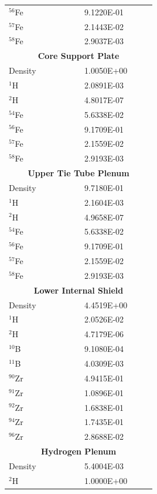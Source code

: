 \documentclass[8pt,a4paper]{article}
\begin{document}
\begin{longtable}{|m{0.3\linewidth}|m{0.2\linewidth}|}
    $^{56}$Fe & \SI{9.1220E-01}{} \\
    $^{57}$Fe & \SI{2.1443E-02}{} \\
    $^{58}$Fe & \SI{2.9037E-03}{} \\\hline
    \multicolumn{2}{|c|}{\textbf{Core Support Plate}}\\\hline
    Density & \SI{1.0050E+00}{} \\
    $^{1}$H & \SI{2.0891E-03}{} \\
    $^{2}$H & \SI{4.8017E-07}{} \\
    $^{54}$Fe & \SI{5.6338E-02}{} \\
    $^{56}$Fe & \SI{9.1709E-01}{} \\
    $^{57}$Fe & \SI{2.1559E-02}{} \\
    $^{58}$Fe & \SI{2.9193E-03}{} \\\hline
    \multicolumn{2}{|c|}{\textbf{Upper Tie Tube Plenum}}\\\hline
    Density & \SI{9.7180E-01}{} \\
    $^{1}$H & \SI{2.1604E-03}{} \\
    $^{2}$H & \SI{4.9658E-07}{} \\
    $^{54}$Fe & \SI{5.6338E-02}{} \\
    $^{56}$Fe & \SI{9.1709E-01}{} \\
    $^{57}$Fe & \SI{2.1559E-02}{} \\
    $^{58}$Fe & \SI{2.9193E-03}{} \\\hline
    \multicolumn{2}{|c|}{\textbf{Lower Internal Shield}}\\\hline
    Density & \SI{4.4519E+00}{} \\
    $^{1}$H & \SI{2.0526E-02}{} \\
    $^{2}$H & \SI{4.7179E-06}{} \\
    $^{10}$B & \SI{9.1080E-04}{} \\
    $^{11}$B & \SI{4.0309E-03}{} \\
    $^{90}$Zr & \SI{4.9415E-01}{} \\
    $^{91}$Zr & \SI{1.0896E-01}{} \\
    $^{92}$Zr & \SI{1.6838E-01}{} \\
    $^{94}$Zr & \SI{1.7435E-01}{} \\
    $^{96}$Zr & \SI{2.8688E-02}{} \\\hline
    \multicolumn{2}{|c|}{\textbf{Hydrogen Plenum}}\\\hline
    Density & \SI{5.4004E-03}{} \\
    $^{2}$H & \SI{1.0000E+00}{} \\\hline

\end{longtable}
\end{document}
